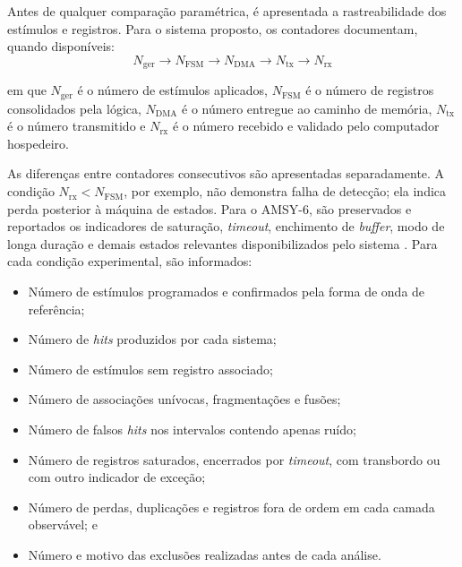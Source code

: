 Antes de qualquer comparação paramétrica, é apresentada a rastreabilidade dos estímulos e registros. Para o sistema proposto, os contadores documentam, quando disponíveis:
\begin{equation}
	N_{\mathrm{ger}} \longrightarrow N_{\mathrm{FSM}} \longrightarrow N_{\mathrm{DMA}} \longrightarrow N_{\mathrm{tx}} \longrightarrow N_{\mathrm{rx}}
	\label{v2:eq:fluxo_contadores_resultados}
\end{equation}

\noindent
em que \(N_{\mathrm{ger}}\) é o número de estímulos aplicados, \(N_{\mathrm{FSM}}\) é o número de registros consolidados pela lógica, \(N_{\mathrm{DMA}}\) é o número entregue ao caminho de memória, \(N_{\mathrm{tx}}\) é o número transmitido e \(N_{\mathrm{rx}}\) é o número recebido e validado pelo computador hospedeiro.

As diferenças entre contadores consecutivos são apresentadas separadamente. A condição \(N_{\mathrm{rx}}<N_{\mathrm{FSM}}\), por exemplo, não demonstra falha de detecção; ela indica perda posterior à máquina de estados. Para o AMSY-6, são preservados e reportados os indicadores de saturação, \textit{timeout}, enchimento de \textit{buffer}, modo de longa duração e demais estados relevantes disponibilizados pelo sistema \cite{vallen2022}. Para cada condição experimental, são informados:

\begin{itemize}
	\item Número de estímulos programados e confirmados pela forma de onda de referência;
	
	\item Número de \textit{hits} produzidos por cada sistema;
	
	\item Número de estímulos sem registro associado;
	
	\item Número de associações unívocas, fragmentações e fusões;
	
	\item Número de falsos \textit{hits} nos intervalos contendo apenas ruído;
	
	\item Número de registros saturados, encerrados por \textit{timeout}, com transbordo ou com outro indicador de exceção;
	
	\item Número de perdas, duplicações e registros fora de ordem em cada camada observável; e
	
	\item Número e motivo das exclusões realizadas antes de cada análise.
\end{itemize}


